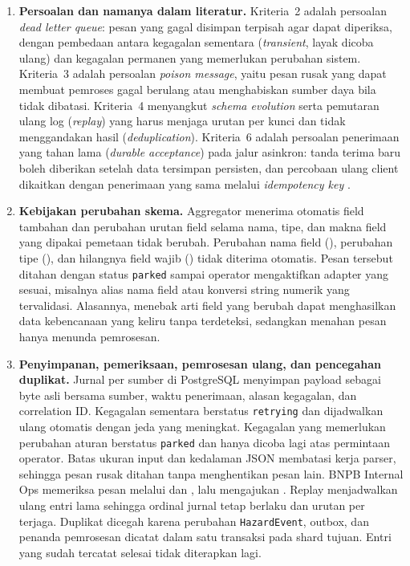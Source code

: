 \begin{enumerate}
\item \textbf{Persoalan dan namanya dalam literatur.} Kriteria~2 adalah persoalan \emph{dead letter queue}: pesan yang gagal disimpan terpisah agar dapat diperiksa, dengan pembedaan antara kegagalan sementara (\emph{transient}, layak dicoba ulang) dan kegagalan permanen yang memerlukan perubahan sistem. Kriteria~3 adalah persoalan \emph{poison message}, yaitu pesan rusak yang dapat membuat pemroses gagal berulang atau menghabiskan sumber daya bila tidak dibatasi. Kriteria~4 menyangkut \emph{schema evolution} serta pemutaran ulang log (\emph{replay}) yang harus menjaga urutan per kunci dan tidak menggandakan hasil (\emph{deduplication}). Kriteria~6 adalah persoalan penerimaan yang tahan lama (\emph{durable acceptance}) pada jalur asinkron: tanda terima baru boleh diberikan setelah data tersimpan persisten, dan percobaan ulang client dikaitkan dengan penerimaan yang sama melalui \emph{idempotency key} \cite{kleppmann2017}.

\item \textbf{Kebijakan perubahan skema.} Aggregator menerima otomatis field tambahan dan perubahan urutan field selama nama, tipe, dan makna field yang dipakai pemetaan tidak berubah. Perubahan nama field (), perubahan tipe (), dan hilangnya field wajib () tidak diterima otomatis. Pesan tersebut ditahan dengan status \texttt{parked} sampai operator mengaktifkan adapter yang sesuai, misalnya alias nama field atau konversi string numerik yang tervalidasi. Alasannya, menebak arti field yang berubah dapat menghasilkan data kebencanaan yang keliru tanpa terdeteksi, sedangkan menahan pesan hanya menunda pemrosesan.

\item \textbf{Penyimpanan, pemeriksaan, pemrosesan ulang, dan pencegahan duplikat.} Jurnal per sumber di PostgreSQL menyimpan payload sebagai byte asli bersama sumber, waktu penerimaan, alasan kegagalan, dan correlation ID. Kegagalan sementara berstatus \texttt{retrying} dan dijadwalkan ulang otomatis dengan jeda yang meningkat. Kegagalan yang memerlukan perubahan aturan berstatus \texttt{parked} dan hanya dicoba lagi atas permintaan operator. Batas ukuran input dan kedalaman JSON membatasi kerja parser, sehingga pesan rusak ditahan tanpa menghentikan pesan lain. BNPB Internal Ops memeriksa pesan melalui  dan , lalu mengajukan . Replay menjadwalkan ulang entri lama sehingga ordinal jurnal tetap berlaku dan urutan per  terjaga. Duplikat dicegah karena perubahan \texttt{HazardEvent}, outbox, dan penanda pemrosesan dicatat dalam satu transaksi pada shard tujuan. Entri yang sudah tercatat selesai tidak diterapkan lagi.


\end{enumerate}
